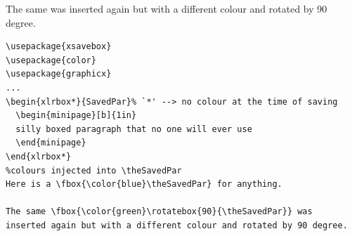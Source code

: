 \documentclass[a4paper]{article}
\begin{document}
The same  was inserted again but with a different colour and rotated by 90 degree.

\begin{Verbatim}
\usepackage{xsavebox}  
\usepackage{color}
\usepackage{graphicx}
...
\begin{xlrbox*}{SavedPar}% `*' --> no colour at the time of saving
  \begin{minipage}[b]{1in}
  silly boxed paragraph that no one will ever use
  \end{minipage}
\end{xlrbox*}
%colours injected into \theSavedPar
Here is a \fbox{\color{blue}\theSavedPar} for anything.

The same \fbox{\color{green}\rotatebox{90}{\theSavedPar}} was
inserted again but with a different colour and rotated by 90 degree.
\end{Verbatim}
\end{document}

